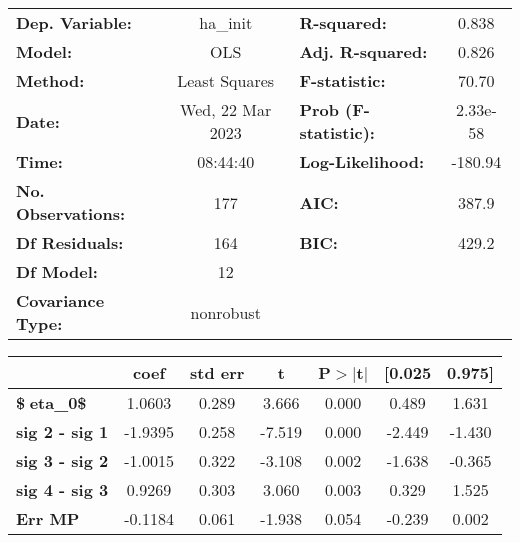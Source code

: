 \begin{center}
\begin{tabular}{lclc}
\toprule
\textbf{Dep. Variable:}    &     ha\_init     & \textbf{  R-squared:         } &    0.838  \\
\textbf{Model:}            &       OLS        & \textbf{  Adj. R-squared:    } &    0.826  \\
\textbf{Method:}           &  Least Squares   & \textbf{  F-statistic:       } &    70.70  \\
\textbf{Date:}             & Wed, 22 Mar 2023 & \textbf{  Prob (F-statistic):} & 2.33e-58  \\
\textbf{Time:}             &     08:44:40     & \textbf{  Log-Likelihood:    } &  -180.94  \\
\textbf{No. Observations:} &         177      & \textbf{  AIC:               } &    387.9  \\
\textbf{Df Residuals:}     &         164      & \textbf{  BIC:               } &    429.2  \\
\textbf{Df Model:}         &          12      & \textbf{                     } &           \\
\textbf{Covariance Type:}  &    nonrobust     & \textbf{                     } &           \\
\bottomrule
\end{tabular}
\end{center}\begin{center}
\begin{tabular}{lcccccc}
\toprule
                                & \textbf{coef} & \textbf{std err} & \textbf{t} & \textbf{P$> |$t$|$} & \textbf{[0.025} & \textbf{0.975]}  \\
\midrule
\textbf{\$eta\_{0}\$}          &       1.0603  &        0.289     &     3.666  &         0.000        &        0.489    &        1.631     \\
\textbf{sig 2 - sig 1}          &      -1.9395  &        0.258     &    -7.519  &         0.000        &       -2.449    &       -1.430     \\
\textbf{sig 3 - sig 2}          &      -1.0015  &        0.322     &    -3.108  &         0.002        &       -1.638    &       -0.365     \\
\textbf{sig 4 - sig 3}          &       0.9269  &        0.303     &     3.060  &         0.003        &        0.329    &        1.525     \\
\textbf{Err MP}                 &      -0.1184  &        0.061     &    -1.938  &         0.054        &       -0.239    &        0.002     \\

\end{tabular}
\end{center}

